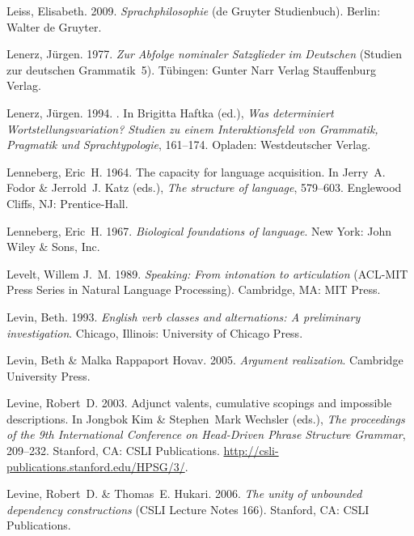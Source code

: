 \begin{thebibliography}{1420}
Leiss, Elisabeth. 2009.
\newblock \emph{Sprachphilosophie}  (de Gruyter Studienbuch).
\newblock Berlin: Walter de Gruyter.

Lenerz, J{\"u}rgen. 1977.
\newblock \emph{{Zur Abfolge nominaler Satzglieder im Deutschen}} (Studien zur
  deutschen Grammatik~5).
\newblock T{\"u}bingen: \original Gunter Narr Verlag \jetzt Stauffenburg
  Verlag.

Lenerz, J{\"u}rgen. 1994.
.
\newblock In Brigitta Haftka (ed.), \emph{{Was determiniert
  Wortstellungsvariation? Studien zu einem Interaktionsfeld von Grammatik,
  Pragmatik und Sprachtypologie}}, 161--174. Opladen: Westdeutscher Verlag.

Lenneberg, Eric~H. 1964.
\newblock The capacity for language acquisition.
\newblock In Jerry~A. Fodor \& Jerrold~J. Katz (eds.), \emph{The structure of
  language}, 579--603. Englewood Cliffs, NJ: Prentice-Hall.

Lenneberg, Eric~H. 1967.
\newblock \emph{Biological foundations of language}.
\newblock New York: John Wiley \& Sons, Inc.

Levelt, Willem J.~M. 1989.
\newblock \emph{Speaking: From intonation to articulation}  ({ACL-MIT} Press
  Series in Natural Language Processing).
\newblock Cambridge, MA: MIT Press.

Levin, Beth. 1993.
\newblock \emph{English verb classes and alternations: {A} preliminary
  investigation}.
\newblock Chicago, Illinois: University of Chicago Press.

Levin, Beth \& Malka {Rappaport Hovav}. 2005.
\newblock \emph{Argument realization}.
\newblock Cambridge University Press.

Levine, Robert~D. 2003.
\newblock Adjunct valents, cumulative scopings and impossible descriptions.
\newblock In Jongbok Kim \& Stephen~Mark Wechsler (eds.), \emph{The proceedings
  of the {9th International Conference on Head-Driven Phrase Structure
  Grammar}}, 209--232. Stanford, CA: CSLI Publications.
\newblock \urlprefix\url{http://csli-publications.stanford.edu/HPSG/3/}.

Levine, Robert~D. \& Thomas~E. Hukari. 2006.
\newblock \emph{The unity of unbounded dependency constructions} (CSLI Lecture
  Notes 166).
\newblock Stanford, CA: CSLI Publications.


\end{thebibliography}
